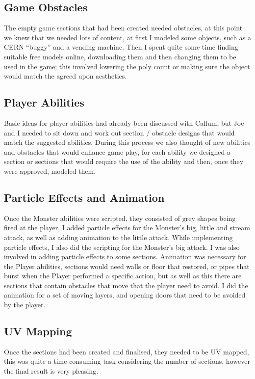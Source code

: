 \documentclass[a4paper,oneside]{memoir}
\begin{document}
			\subsection{Game Obstacles}
				The empty game sections that had been created needed obstacles, at this point we knew that we needed lots of content, at first I modeled some objects, such as a CERN ``buggy'' and a vending machine.
				Then I spent quite some time finding suitable free models online, downloading them and then changing them to be used in the game; this involved lowering the poly count or making sure the object would match the agreed upon aesthetics.

			\subsection{Player Abilities}
				Basic ideas for player abilities had already been discussed with Callum, but Joe and I needed to sit down and work out section / obstacle designs that would match the suggested abilities.
				During this process we also thought of new abilities and obstacles that would enhance game play, for each ability we designed a section or sections that would require the use of the ability and then, once they were approved, modeled them.

			\subsection{Particle Effects and Animation}
				Once the Monster abilities were scripted, they consisted of grey shapes being fired at the player, I added particle effects for the Monster's big, little and stream attack, as well as adding animation to the little attack. While implementing particle effects, I also did the scripting for the Monster's big attack. 
				I was also involved in adding particle effects to some sections.
				Animation was necessary for the Player abilities, sections would need walls or floor that restored, or pipes that burst when the Player performed a specific action, but as well as this there are sections that contain obstacles that move that the player need to avoid.
				I did the animation for a set of moving layers, and opening doors that need to be avoided by the player.

			\subsection{UV Mapping}
				Once the sections had been created and finalised, they needed to be UV mapped, this was quite a time-consuming task considering the number of sections, however the final result is very pleasing.
\end{document}
